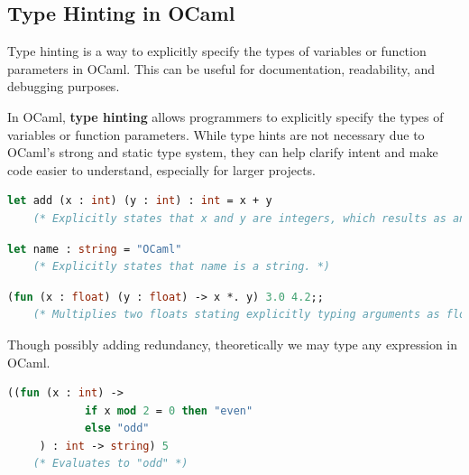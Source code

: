 \newpage 


\subsection{Type Hinting in OCaml}
\noindent
Type hinting is a way to explicitly specify the types of variables or function parameters in OCaml. This can be useful for documentation, readability, and debugging purposes.\\

\begin{Def}

    In OCaml, \textbf{type hinting} allows programmers to explicitly specify the types of variables or function parameters. While type hints are not necessary due to OCaml's strong and static type system, 
    they can help clarify intent and make code easier to understand, especially for larger projects.\\

   
    \begin{lstlisting}[language=OCaml, caption={Adding Type Annotations to Functions}, numbers=none]
    let add (x : int) (y : int) : int = x + y
    (* Explicitly states that x and y are integers, which results as an integer. *)
    \end{lstlisting}
    \noindent
   
    \begin{lstlisting}[language=OCaml, caption={Adding Type Annotations to Variables}, numbers=none]
    let name : string = "OCaml"
    (* Explicitly states that name is a string. *)
    \end{lstlisting}


    \begin{lstlisting}[language=OCaml, caption={Type Hinting in Anonymous Functions}, numbers=none]
    (fun (x : float) (y : float) -> x *. y) 3.0 4.2;;
    (* Multiplies two floats stating explicitly typing arguments as floats. *)
    \end{lstlisting}

    Though possibly adding redundancy, theoretically we may type any expression in OCaml.
\begin{lstlisting}[language=OCaml, caption={Type Hinting in Conditional Expressions}, numbers=none]
    ((fun (x : int) -> 
            if x mod 2 = 0 then "even" 
            else "odd"
     ) : int -> string) 5 
    (* Evaluates to "odd" *)
\end{lstlisting}
\end{Def}

